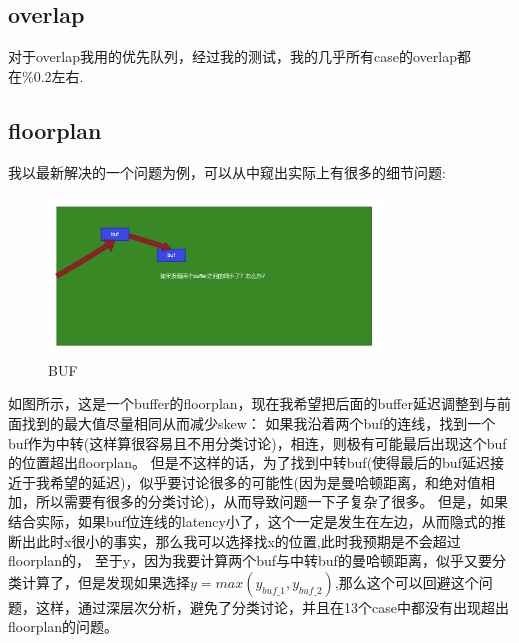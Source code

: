 \documentclass[12pt]{ctexart}
\begin{document}
\subsection{overlap}
对于overlap我用的优先队列，经过我的测试，我的几乎所有case的overlap都在\%0.2左右.
\subsection{floorplan}
我以最新解决的一个问题为例，可以从中窥出实际上有很多的细节问题:
\begin{figure}[h]
    \centering
    \includegraphics[width=0.8\textwidth]{buf-floorplan.png}
    \caption{BUF}
    \label{fig:example}
\end{figure}
如图所示，这是一个buffer的floorplan，现在我希望把后面的buffer延迟调整到与前面找到的最大值尽量相同从而减少skew：
如果我沿着两个buf的连线，找到一个buf作为中转(这样算很容易且不用分类讨论)，相连，则极有可能最后出现这个buf的位置超出floorplan。
但是不这样的话，为了找到中转buf(使得最后的buf延迟接近于我希望的延迟)，似乎要讨论很多的可能性(因为是曼哈顿距离，和绝对值相加，所以需要有很多的分类讨论)，从而导致问题一下子复杂了很多。
但是，如果结合实际，如果buf位连线的latency小了，这个一定是发生在左边，从而隐式的推断出此时x很小的事实，那么我可以选择找x的位置,此时我预期是不会超过floorplan的，
至于y，因为我要计算两个buf与中转buf的曼哈顿距离，似乎又要分类计算了，但是发现如果选择$y=max(y_{buf\_1},y_{buf\_2})$,那么这个可以回避这个问题，这样，通过深层次分析，避免了分类讨论，并且在13个case中都没有出现超出floorplan的问题。\\
\end{document}
